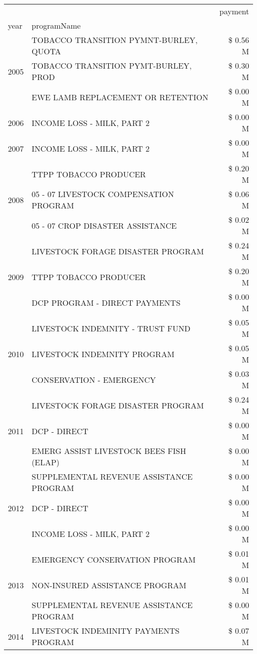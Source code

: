\begin{tabular}{llr}
\toprule
 &  & payment \\
year & programName &  \\
\midrule
\multirow[t]{3}{*}{2005} & TOBACCO TRANSITION PYMNT-BURLEY, QUOTA & \$ 0.56 M \\
 & TOBACCO TRANSITION PYMT-BURLEY, PROD & \$ 0.30 M \\
 & EWE LAMB REPLACEMENT OR RETENTION & \$ 0.00 M \\
\cline{1-3}
2006 & INCOME LOSS - MILK, PART 2 & \$ 0.00 M \\
\cline{1-3}
2007 & INCOME LOSS - MILK, PART 2 & \$ 0.00 M \\
\cline{1-3}
\multirow[t]{3}{*}{2008} & TTPP TOBACCO PRODUCER & \$ 0.20 M \\
 & 05 - 07 LIVESTOCK COMPENSATION PROGRAM & \$ 0.06 M \\
 & 05 - 07 CROP DISASTER ASSISTANCE & \$ 0.02 M \\
\cline{1-3}
\multirow[t]{3}{*}{2009} & LIVESTOCK FORAGE DISASTER  PROGRAM & \$ 0.24 M \\
 & TTPP TOBACCO PRODUCER & \$ 0.20 M \\
 & DCP PROGRAM - DIRECT PAYMENTS & \$ 0.00 M \\
\cline{1-3}
\multirow[t]{3}{*}{2010} & LIVESTOCK INDEMNITY - TRUST FUND & \$ 0.05 M \\
 & LIVESTOCK INDEMNITY PROGRAM & \$ 0.05 M \\
 & CONSERVATION - EMERGENCY & \$ 0.03 M \\
\cline{1-3}
\multirow[t]{3}{*}{2011} & LIVESTOCK FORAGE DISASTER PROGRAM & \$ 0.24 M \\
 & DCP - DIRECT & \$ 0.00 M \\
 & EMERG ASSIST LIVESTOCK BEES FISH (ELAP) & \$ 0.00 M \\
\cline{1-3}
\multirow[t]{3}{*}{2012} & SUPPLEMENTAL REVENUE ASSISTANCE PROGRAM & \$ 0.00 M \\
 & DCP - DIRECT & \$ 0.00 M \\
 & INCOME LOSS - MILK, PART 2 & \$ 0.00 M \\
\cline{1-3}
\multirow[t]{3}{*}{2013} & EMERGENCY CONSERVATION PROGRAM & \$ 0.01 M \\
 & NON-INSURED ASSISTANCE PROGRAM & \$ 0.01 M \\
 & SUPPLEMENTAL REVENUE ASSISTANCE PROGRAM & \$ 0.00 M \\
\cline{1-3}
\multirow[t]{3}{*}{2014} & LIVESTOCK INDEMINITY PAYMENTS PROGRAM & \$ 0.07 M \\

\end{tabular}
